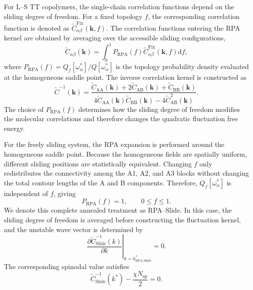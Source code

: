 \documentclass[journal=mamobx,manuscript=article]{achemso}
\begin{document}
	For L--S TT copolymers, the single-chain correlation functions depend on the sliding degree of freedom.
	For a fixed topology $f$, the corresponding correlation function is denoted as
	$\widetilde C_{\alpha\beta}^{\mathrm{Fix}}(\bm k,f)$.\cite{Zhao2024Phase}
	The correlation functions entering the RPA kernel are obtained by averaging over the accessible sliding configurations,
	\begin{equation}
		\widetilde C_{\alpha\beta}(\bm k)
		=
		\int_0^1
		P_{\mathrm{RPA}}(f)
		\widetilde C_{\alpha\beta}^{\mathrm{Fix}}(\bm k,f)
		\mathrm df,
		\label{eq:RPACorrelation}
	\end{equation}
	where $P_{\mathrm{RPA}}(f)=Q_f[\omega_\alpha^\ast]/Q[\omega_\alpha^\ast]$ is the topology probability density evaluated at the homogeneous saddle point.
	The inverse correlation kernel is constructed as
	\begin{equation}
		\widetilde C^{-1}(\bm k)
		=
		\frac{
			\widetilde C_{\mathrm{AA}}(\bm k)
			+2\widetilde C_{\mathrm{AB}}(\bm k)
			+\widetilde C_{\mathrm{BB}}(\bm k)
		}
		{
			4\widetilde C_{\mathrm{AA}}(\bm k)
			\widetilde C_{\mathrm{BB}}(\bm k)
			-
			4\widetilde C_{\mathrm{AB}}^2(\bm k)
		} .
		\label{eq:RPACorrelationInverse}
	\end{equation}
	The choice of $P_{\mathrm{RPA}}(f)$ determines how the sliding degree of freedom modifies the molecular correlations and therefore changes the quadratic fluctuation free energy.


	For the freely sliding system, the RPA expansion is performed around the homogeneous saddle point.
	Because the homogeneous fields are spatially uniform, different sliding positions are statistically equivalent.
	Changing $f$ only redistributes the connectivity among the A1, A2, and A3 blocks without changing the total contour lengths of the A and B components.
	Therefore, $Q_f[\omega_\alpha^\ast]$ is independent of $f$, giving
	\begin{equation}
		P_{\mathrm{RPA}}(f)=1,
		\qquad
		0\leq f\leq1.
	\end{equation}
	We denote this complete annealed treatment as RPA--Slide.
	In this case, the sliding degree of freedom is averaged before constructing the fluctuation kernel, and the unstable wave vector is determined by
	\begin{equation}
		\left.
		\frac{\partial
		\widetilde C_{\mathrm{Slide}}^{-1}(k)}
		{\partial k}
		\right|_{k=k_{\mathrm{RPA\text{-}Slide}}^\ast}
		=
		0.
	\end{equation}
	The corresponding spinodal value satisfies
	\begin{equation}
		\widetilde C_{\mathrm{Slide}}^{-1}(k^\ast)
		-
		\frac{\chi N_{\mathrm{sp}}}{2}
		=
		0.
	\end{equation}
\end{document}
